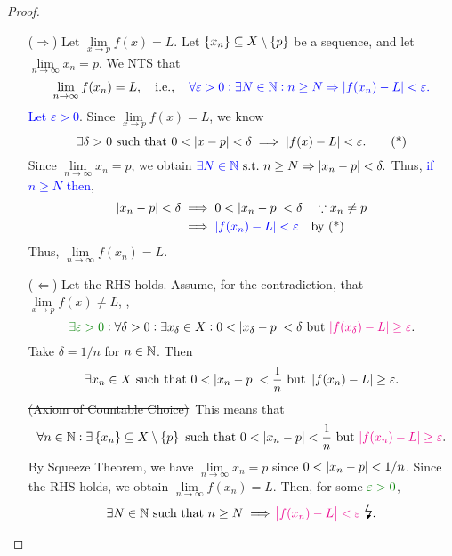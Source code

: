 \documentclass[11pt,openany]{article}
\begin{document}
\begin{proof}
\begin{itemize}
	\item[($\Rightarrow$)] Let $\lim\limits_{x\to p}f(x)=L$. Let $\set{x_n}\subseteq X\setminus\set{p}$ be a sequence, and let $\lim\limits_{n\to\infty}x_n=p$. We NTS that \[
	\lim\limits_{n\to\infty}f(x_n)=L,\quad\textnormal{i.e.},\color{blue}\quad\forall\varepsilon>0:\exists N\in\mathbb{N}:n\geq N\Rightarrow\abs[0]{f(x_n)-L}<\varepsilon.
	\] \textcolor{blue}{Let $\varepsilon>0$}. Since $\lim\limits_{x\to p}f(x)=L$, we know \begin{equation*}
		\exists\delta>0\ \text{such that}\ 0<\abs[0]{x-p}<\delta\implies\abs[0]{f(x)-L}<\varepsilon.\tag{*}
	\end{equation*} Since $\lim\limits_{n\to\infty}x_n=p$, we obtain $
	\textcolor{blue}{\exists N\in\N}\ \text{s.t.}\ n\geq N\Rightarrow\abs[0]{x_n-p}<\delta.
	$ Thus, \textcolor{blue}{if $n\geq N$ then}, \begin{align*}
		\abs[0]{x_n-p}<\delta&\implies 0<\abs[0]{x_n-p}<\delta\quad\because x_n\neq p \\
		&\implies\textcolor{blue}{\abs[0]{f(x_n)-L}<\varepsilon}\quad\text{by (*)}
	\end{align*} Thus, $\lim\limits_{n\to\infty}f(x_n)=L$.
	\item[($\Leftarrow$)] Let the RHS holds. Assume, for the contradiction, that $\lim\limits_{x\to p} f(x)\neq L$, \ie, \[
	\textcolor{green!50!black}{\exists\varepsilon>0}:\forall\delta>0:\exists x_\delta\in X:0<\abs[0]{x_\delta-p}<\delta\ \text{but}\ \textcolor{magenta}{\abs[0]{f(x_\delta)-L}\geq\varepsilon}.
	\] Take $\delta=1/n$ for $n\in\mathbb{N}$. Then \[
	\exists x_n\in X\ \text{such that}\ 0<\abs[0]{x_n-p}<\frac{1}{n}\ \text{but}\ \abs[0]{f(x_n)-L}\geq \varepsilon.
	\] \textcolor{gray!50}{\st{(Axiom of Countable Choice)}}\ This means that \[
	\forall n\in\N:\exists\set{x_n}\subseteq X\setminus\set{p}\ \text{such that}\ 0<\abs[0]{x_n-p}<\frac{1}{n}\ \text{but}\ \textcolor{magenta}{\abs[0]{f(x_n)-L}\geq \varepsilon}.
	\] By Squeeze Theorem, we have $\lim\limits_{n\to\infty}x_n=p$ since $0<\abs[0]{x_n-p}<1/n$. Since the RHS holds, we obtain $\lim\limits_{n\to\infty}f(x_n)=L$. Then, for some $\textcolor{green!50!black}{\varepsilon>0}$, \[
	\exists N\in\N\ \text{such that}\ n\geq N\implies\textcolor{magenta}{\abs{f(x_n)-L}<\varepsilon}\ \text{\Large\lightning}.
	\]
\end{itemize}
\end{proof}
\end{document}
